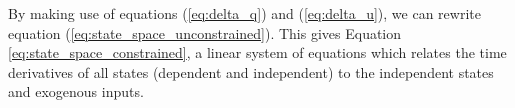 \documentclass[smallcondensed]{svjour3}                     %
\begin{document}
By making use of equations (\ref{eq:delta_q}) and (\ref{eq:delta_u}), we can
rewrite equation (\ref{eq:state_space_unconstrained}).  This gives Equation
\ref{eq:state_space_constrained}, a linear system of equations which relates
the time derivatives of all states (dependent and independent) to the
independent states and exogenous inputs.

\end{document}
